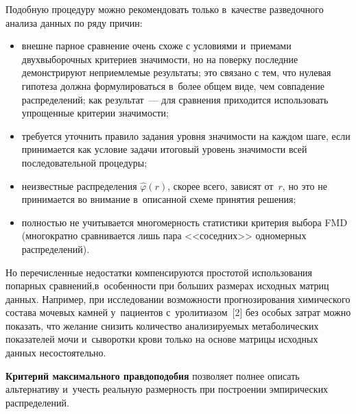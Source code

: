 \begin{multicols}{2}
     Подобную процедуру можно рекомендовать только в~качестве 
разведочного анализа данных по ряду причин:
     \begin{itemize}
\item внешне парное сравнение очень схоже с условиями и~приемами 
двухвыборочных критериев значимости, но на поверку последние 
демонстрируют неприемлемые результаты; это связано с тем, что нулевая 
гипотеза должна формулироваться в~более общем виде, чем совпадение 
распределений; как результат~--- для сравнения приходится использовать 
упрощенные критерии значимости; 
\item требуется уточнить правило задания уровня значимости на каждом шаге, 
если принимается как условие задачи итоговый уровень зна\-чи\-мости всей 
последовательной процедуры;
\item неизвестные распределения $\hat{\varphi}(r)$, скорее всего, зависят 
от~$r$, но это не принимается во внимание в~описанной схеме принятия 
решения;
\item полностью не учитывается многомерность статистики критерия выбора 
FMD (многократно сравнивается лишь пара <<соседних>> одномерных 
распределений).
\end{itemize}

     Но перечисленные недостатки компенсируются простотой использования 
попарных сравнений,\linebreak в~особенности при больших размерах исходных мат\-риц 
данных. Например, при исследовании возможности прогнозирования 
химического состава мочевых камней у~пациентов с~уролитиазом~[2] без\linebreak 
особых затрат можно показать, что желание снизить количество анализируемых 
метаболических показателей мочи и~сыворотки крови только на основе 
матрицы исходных данных несостоятельно.
     
     \textbf{Критерий максимального правдоподобия} позволяет полнее 
описать альтернативу и~учесть реальную размерность при построении 
эмпирических распределений. 
     

\end{multicols}
